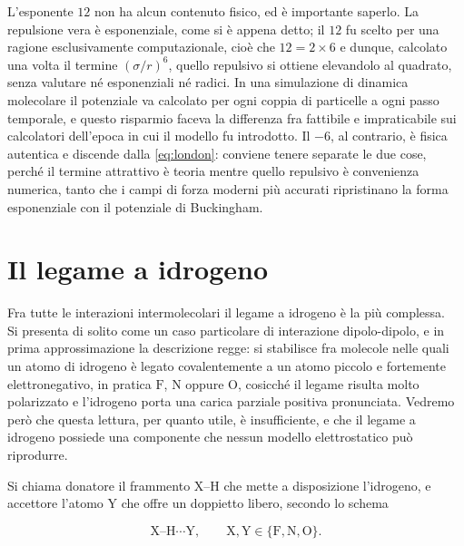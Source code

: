 L'esponente $12$ non ha alcun contenuto fisico, ed è importante saperlo.
La repulsione vera è esponenziale, come si è appena detto; il $12$ fu scelto per una ragione esclusivamente computazionale, cioè che $12 = 2\times 6$ e dunque, calcolato una volta il termine $(\sigma/r)^6$, quello repulsivo si ottiene elevandolo al quadrato, senza valutare né esponenziali né radici.
In una simulazione di dinamica molecolare il potenziale va calcolato per ogni coppia di particelle a ogni passo temporale, e questo risparmio faceva la differenza fra fattibile e impraticabile sui calcolatori dell'epoca in cui il modello fu introdotto.
Il $-6$, al contrario, è fisica autentica e discende dalla \eqref{eq:london}: conviene tenere separate le due cose, perché il termine attrattivo è teoria mentre quello repulsivo è convenienza numerica, tanto che i campi di forza moderni più accurati ripristinano la forma esponenziale con il potenziale di Buckingham.

\section{Il legame a idrogeno}
 
Fra tutte le interazioni intermolecolari il legame a idrogeno è la più complessa.\\

Si presenta di solito come un caso particolare di interazione dipolo-dipolo, e in prima approssimazione la descrizione regge: si stabilisce fra molecole nelle quali un atomo di idrogeno è legato covalentemente a un atomo piccolo e fortemente elettronegativo, in pratica $\mathrm{F}$, $\mathrm{N}$ oppure $\mathrm{O}$, cosicché il legame risulta molto polarizzato e l'idrogeno porta una carica parziale positiva pronunciata.
Vedremo però che questa lettura, per quanto utile, è insufficiente, e che il legame a idrogeno possiede una componente che nessun modello elettrostatico può riprodurre.
 
Si chiama donatore il frammento $\mathrm{X}$--$\mathrm{H}$ che mette a disposizione l'idrogeno, e accettore l'atomo $\mathrm{Y}$ che offre un doppietto libero, secondo lo schema

\begin{equation}
    \mathrm{X}\text{--}\mathrm{H}\cdots\mathrm{Y},
    \qquad \mathrm{X},\mathrm{Y} \in \{\mathrm{F},\mathrm{N},\mathrm{O}\}.
    \label{eq:schemaH}
\end{equation}

